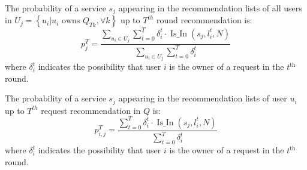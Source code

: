 \begin{definition}  The probability of a service $s_{j}$ appearing in the recommendation lists of all users in $U_j = \left\{u_i | u_i \text{ owns } Q_{Tk}, \forall k \right\}$ up to $T^{t h}$ round recommendation is:
\begin{equation}
p_{j}^{T}=\frac{\sum_{u_{i} \in U_{j}} \sum_{t=0}^{T} \delta_{i}^{t} \cdot  \operatorname{Is\_In}\left(s_{j}, l_{i}^{t}, N\right)}{\sum_{u_{i} \in U_{j}} \sum_{t=0}^{T} \delta_{i}^{t}}
\end{equation}
where $\delta_{i}^{t}$ indicates the possibility that user $i$ is the owner of a request in the $t^{\text{th}}$ round.



\end{definition}
\begin{definition} The probability of a service $s_{j}$ appearing in the recommendation lists of user $u_{i}$ up to $T^{{th}}$ request recommendation in $Q$ is:
\begin{equation}
p_{i, j}^{T}=\frac{\sum_{t=0}^{T} \delta_{i}^{t} \cdot \operatorname{Is\_In}\left(s_{j}, l_{i}^{t}, N\right)}{\sum_{t=0}^{T} \delta_{i}^{t}}
\end{equation}
where $\delta_{i}^{t}$ indicates the possibility that user $i$ is the owner of a request in the $t^{\text{th}}$ round.
\end{definition}

